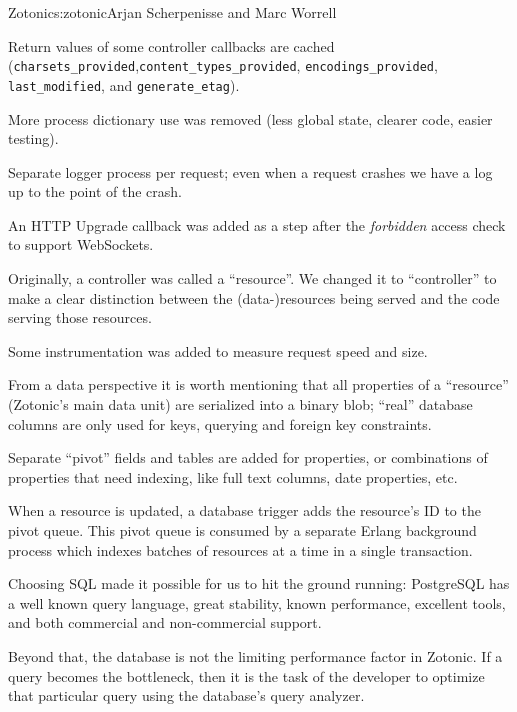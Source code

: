 \begin{aosachapter}{Zotonic}{s:zotonic}{Arjan Scherpenisse and Marc Worrell}
\begin{aosaitemize}
\item
  Return values of some controller callbacks are cached
  (\texttt{charsets\_provided},\linebreak \texttt{content\_types\_provided},
  \texttt{encodings\_provided}, \texttt{last\_modified}, and
  \texttt{generate\_etag}).
\item
  More process dictionary use was removed (less global state, clearer
  code, easier testing).
\item
  Separate logger process per request; even when a request crashes we
  have a log up to the point of the crash.
\item
  An HTTP Upgrade callback was added as a step after the
  \emph{forbidden} access check to support WebSockets.
\item
  Originally, a controller was called a ``resource''. We changed it to
  ``controller'' to make a clear distinction between the
  (data-)resources being served and the code serving those resources.
\item
  Some instrumentation was added to measure request speed and size.
\end{aosaitemize}


\label{posa.zotonic.db}

From a data perspective it is worth mentioning that all properties of a
``resource'' (Zotonic's main data unit) are serialized into a binary
blob; ``real'' database columns are only used for keys, querying and
foreign key constraints.

Separate ``pivot'' fields and tables are added for properties, or
combinations of properties that need indexing, like full text columns,
date properties, etc.

When a resource is updated, a database trigger adds the resource's ID to
the pivot queue. This pivot queue is consumed by a separate Erlang
background process which indexes batches of resources at a time in a
single transaction.

Choosing SQL made it possible for us to hit the ground running:
PostgreSQL has a well known query language, great stability, known
performance, excellent tools, and both commercial and non-commercial
support.

Beyond that, the database is not the limiting performance factor in
Zotonic. If a query becomes the bottleneck, then it is the task of the
developer to optimize that particular query using the database's query
analyzer.


\end{aosachapter}
